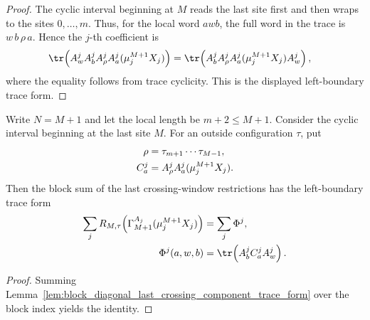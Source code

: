 \begin{proof}
    \leanok
    The cyclic interval beginning at $M$ reads the last site first and then
    wraps to the sites $0,\ldots,m$. Thus, for the local word $awb$, the
    full word in the trace is $w\,b\,\rho\,a$. Hence the $j$-th coefficient is
    \begin{align}
        \tr\!\left(A^j_wA^j_bA^j_\rho A^j_a(\mu_j^{M+1}X_j)\right)
         & =
        \tr\!\left(A^j_bA^j_\rho A^j_a(\mu_j^{M+1}X_j)A^j_w\right),
        \notag
    \end{align}
    where the equality follows from trace cyclicity. This is the displayed
    left-boundary trace form.
\end{proof}

\begin{lemma}
    \label{lem:block_diagonal_last_crossing_trace_form}
    \leanok
    Write $N=M+1$ and let the local length be $m+2\le M+1$. Consider the
    cyclic interval beginning at the last site $M$. For an outside
    configuration $\tau$, put
    \begin{align}
        \rho
         & =\tau_{m+1}\cdots\tau_{M-1},
        \notag                              \\
        C^j_a
         & =A^j_\rho A^j_a(\mu_j^{M+1}X_j).
        \notag
    \end{align}
    Then the block sum of the last crossing-window restrictions has the
    left-boundary trace form
    \begin{align}
        \sum_j
        R_{M,\tau}\!\left(\Gamma_{M+1}^{A_j}(\mu_j^{M+1}X_j)\right)
         & =
        \sum_j \Phi^j,
        \notag \\
        \Phi^j(a,w,b)
         & =
        \tr\!\left(A^j_b C^j_a A^j_w\right).
        \notag
    \end{align}
\end{lemma}

\begin{proof}
    \leanok
    Summing Lemma~\ref{lem:block_diagonal_last_crossing_component_trace_form} over
    the block index yields the identity.
\end{proof}

